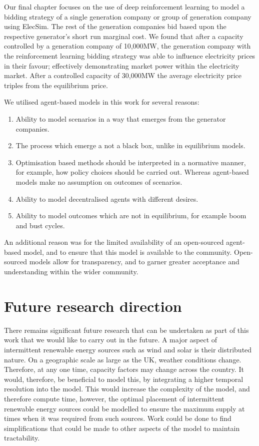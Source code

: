 Our final chapter focuses on the use of deep reinforcement learning to model a bidding strategy of a single generation company or group of generation company using ElecSim. The rest of the generation companies bid based upon the respective generator's short run marginal cost. We found that after a capacity controlled by a generation company of 10,000MW, the generation company with the reinforcement learning bidding strategy was able to influence electricity prices in their favour; effectively demonstrating market power within the electricity market. After a controlled capacity of 30,000MW the average electricity price triples from the equilibrium price. 

We utilised agent-based models in this work for several reasons:
\begin{enumerate}
	\item Ability to model scenarios in a way that emerges from the generator companies.
	\item The process which emerge a not a black box, unlike in equilibrium models.
	\item Optimisation based methods should be interpreted in a normative manner, for example, how policy choices should be carried out. Whereas agent-based models make no assumption on outcomes of scenarios.
	\item Ability to model decentralised agents with different desires.
	\item Ability to model outcomes which are not in equilibrium, for example boom and bust cycles.
\end{enumerate}

An additional reason was for the limited availability of an open-sourced agent-based model, and to ensure that this model is available to the community. Open-sourced models allow for transparency, and to garner greater acceptance and understanding within the wider community. 


\section{Future research direction}

There remains significant future research that can be undertaken as part of this work that we would like to carry out in the future. A major aspect of intermittent renewable energy sources such as wind and solar is their distributed nature. On a geographic scale as large as the UK, weather conditions change. Therefore, at any one time, capacity factors may change across the country. It would, therefore, be beneficial to model this, by integrating a higher temporal resolution into the model. This would increase the complexity of the model, and therefore compute time, however, the optimal placement of intermittent renewable energy sources could be modelled to ensure the maximum supply at times when it was required from such sources. Work could be done to find simplifications that could be made to other aspects of the model to maintain tractability. 

